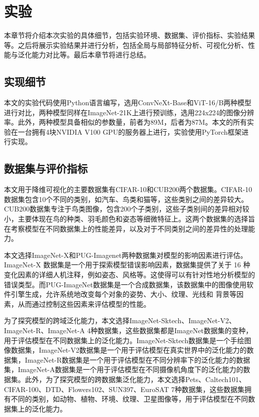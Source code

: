 \section{实验}

本章节将介绍本次实验的具体细节，包括实验环境、数据集、评价指标、实验结果等。之后将展示实验结果并进行分析，包括全局与局部特征分析、可视化分析、性能与泛化能力对比等。最后本章节将进行总结。

\subsection{实现细节}

本文的实验代码使用Python语言编写，选用ConvNeXt-Base和ViT-16/B两种模型进行对比，两种模型同样在ImageNet-21K上进行预训练，选用224x224的图像分辨率。此外，两种模型具备相似的参数量，前者为89M，后者为87M。本文的所有实验在一台拥有4块NVIDIA V100 GPU的服务器上进行，实验使用PyTorch框架进行实现。

\subsection{数据集与评价指标}

本文用于降维可视化的主要数据集有CIFAR-10和CUB200两个数据集。CIFAR-10数据集包含10个不同的类别，如汽车、鸟类和猫等，这些类别之间的差异较大。CUB200数据集专注于鸟类图像，包含200个子类别，这些子类别间的差异相对较小，主要体现在鸟的种类、羽毛颜色和姿态等细微特征上。这两个数据集的选择旨在考察模型在不同数据集上的性能差异，以及对于不同类别之间的差异性的处理能力。

本文选择ImageNet-X和PUG-Imagenet两种数据集对模型的影响因素进行评估。ImageNet-X 数据集是一个用于探索模型错误影响因素，数据集提供了关于 16 种变化因素的详细人机注释，例如姿态、风格等。这使得可以有针对性地分析模型的错误类型。而PUG-ImageNet数据集是一个合成数据集，该数据集中的图像使用软件引擎生成，允许系统地改变每个对象的姿势、大小、纹理、光线和
背景等因素，从而通过控制这些因素来评估模型的性能。

为了探究模型的跨域泛化能力，本文选择ImageNet-Sktech、ImageNet-V2、ImageNet-R、ImageNet-A 4种数据集，这些数据集都是ImageNet数据集的变种，用于评估模型在不同数据集上的泛化能力。ImageNet-Sktech数据集是一个手绘图像数据集，ImageNet-V2数据集是一个用于评估模型在真实世界中的泛化能力的数据集，ImageNet-R数据集是一个用于评估模型在不同分辨率下的泛化能力的数据集，ImageNet-A数据集是一个用于评估模型在不同摄像机角度下的泛化能力的数据集。此外，为了探究模型的跨数据集泛化能力，本文选择Pets、Caltech101、CIFAR-100、DTD、Flowers102、SUN397、EuroSAT 7种数据集，这些数据集拥有不同的类别，如动物、植物、环境、纹理、卫星图像等，用于评估模型在不同数据集上的泛化能力。

